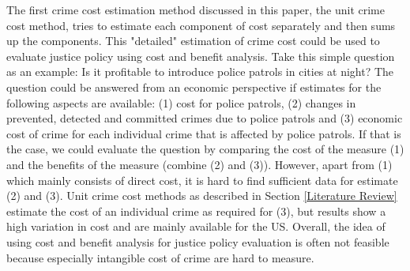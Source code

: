\documentclass[a4paper,12pt]{article}
\begin{document}
The first crime cost estimation method discussed in this paper, the unit crime cost method, tries to estimate each component of cost separately and then sums up the components.
This "detailed" estimation of crime cost could be used to evaluate justice policy using cost and benefit analysis. Take this simple question as an example: Is it profitable to introduce police patrols in cities at night? The question could be answered from an economic perspective if estimates for the following aspects are available: (1) cost for police patrols, (2) changes in prevented, detected and committed crimes due to police patrols and (3) economic cost of crime for each individual crime that is affected by police patrols. If that is the case, we could evaluate the question by comparing the cost of the measure (1) and the benefits of the measure (combine (2) and (3)).
However, apart from (1) which mainly consists of direct cost, it is hard to find sufficient data for estimate (2) and (3). Unit crime cost methods as described in Section \ref{Literature Review} estimate the cost of an individual crime as required for (3), but results show a high variation in cost and are mainly available for the US. 
Overall, the idea of using cost and benefit analysis for justice policy evaluation is often not feasible because especially intangible cost of crime are hard to measure.
\end{document}

